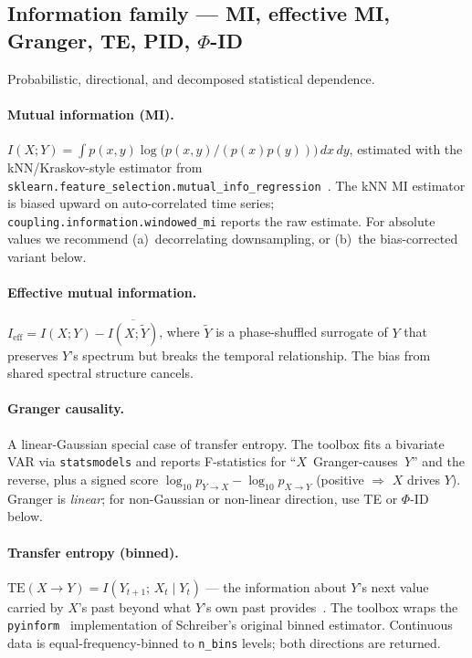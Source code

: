 \documentclass[11pt,a4paper]{article}
\begin{document}
\subsection{Information family --- MI, effective MI, Granger, TE, PID, $\Phi$-ID}

Probabilistic, directional, and decomposed statistical dependence.

\paragraph{Mutual information (MI).}
$I(X;Y) = \int p(x,y) \log\!\bigl(p(x,y) / (p(x)p(y))\bigr)\,dx\,dy$,
estimated with the kNN/Kraskov-style estimator from
\texttt{sklearn.feature\_selection.mutual\_info\_regression}~\cite{Kraskov2004}.
The kNN MI estimator is biased upward on auto-correlated time series;
\texttt{coupling.information.windowed\_mi} reports the raw estimate.
For absolute values we recommend (a)~decorrelating downsampling, or
(b)~the bias-corrected variant below.

\paragraph{Effective mutual information.}
\(I_{\text{eff}} = I(X;Y) - \overline{I(X; \tilde Y)}\), where $\tilde Y$
is a phase-shuffled surrogate of $Y$ that preserves $Y$'s spectrum but
breaks the temporal relationship. The bias from shared spectral
structure cancels.

\paragraph{Granger causality.}
A linear-Gaussian special case of transfer entropy. The toolbox fits a
bivariate VAR via \texttt{statsmodels} and reports F-statistics for
``$X$~Granger-causes~$Y$'' and the reverse, plus a signed score
$\log_{10}p_{Y\to X} - \log_{10}p_{X\to Y}$ (positive $\Rightarrow$
$X$ drives $Y$). Granger is \emph{linear}; for non-Gaussian or
non-linear direction, use TE or $\Phi$-ID below.

\paragraph{Transfer entropy (binned).}
$\text{TE}(X \to Y) = I(Y_{t+1};\, X_t \mid Y_t)$ --- the information
about $Y$'s next value carried by $X$'s past beyond what $Y$'s own
past provides~\cite{Schreiber2000}. The toolbox wraps the
\texttt{pyinform}~\cite{pyinform2018} implementation of Schreiber's
original binned estimator. Continuous data is equal-frequency-binned
to \texttt{n\_bins} levels; both directions are returned.
\end{document}
